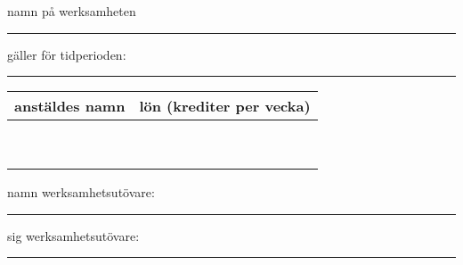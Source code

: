 \documentclass{letter}
\begin{document}
namn på werksamheten
\vspace*{1cm}
\hrule
gäller för tidperioden:
\vspace*{1cm}
\hrule



\begin{tabular}{ |p{5.5cm}|p{3.5cm}|}
	anstäldes namn & lön (krediter per vecka)\\ \hline
	\vspace{0.5cm}& \vspace{0.5cm} \\\hline
	\vspace{0.5cm}& \vspace{0.5cm} \\\hline
	\vspace{0.5cm}& \vspace{0.5cm} \\\hline
	\vspace{0.5cm}& \vspace{0.5cm} \\\hline
	\vspace{0.5cm}& \vspace{0.5cm} \\\hline
	\vspace{0.5cm}& \vspace{0.5cm} \\\hline
	\vspace{0.5cm}& \vspace{0.5cm} \\\hline
	\vspace{0.5cm}& \vspace{0.5cm} \\\hline
	\vspace{0.5cm}& \vspace{0.5cm} \\\hline
\end{tabular}

\vfill

namn werksamhetsutövare:
\vspace*{1cm}
\hrule
sig werksamhetsutövare:
\vspace*{1cm}
\hrule
\end{document}
